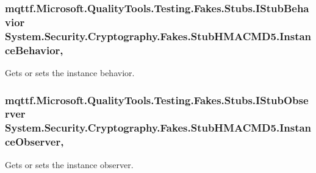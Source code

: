 \hypertarget{class_system_1_1_security_1_1_cryptography_1_1_fakes_1_1_stub_h_m_a_c_m_d5_ace9820fb7b4d98d2214ba3f9b1044179}{
\subsubsection[{Instance\-Behavior}]{\setlength{\rightskip}{0pt plus 5cm}mqttf.\-Microsoft.\-Quality\-Tools.\-Testing.\-Fakes.\-Stubs.\-I\-Stub\-Behavior System.\-Security.\-Cryptography.\-Fakes.\-Stub\-H\-M\-A\-C\-M\-D5.\-Instance\-Behavior\hspace{0.3cm}{\ttfamily [get]}, {\ttfamily [set]}}}\label{class_system_1_1_security_1_1_cryptography_1_1_fakes_1_1_stub_h_m_a_c_m_d5_ace9820fb7b4d98d2214ba3f9b1044179}


Gets or sets the instance behavior.

\hypertarget{class_system_1_1_security_1_1_cryptography_1_1_fakes_1_1_stub_h_m_a_c_m_d5_a0ea9cb642bdce37c50cb92a8cf85859e}{
\subsubsection[{Instance\-Observer}]{\setlength{\rightskip}{0pt plus 5cm}mqttf.\-Microsoft.\-Quality\-Tools.\-Testing.\-Fakes.\-Stubs.\-I\-Stub\-Observer System.\-Security.\-Cryptography.\-Fakes.\-Stub\-H\-M\-A\-C\-M\-D5.\-Instance\-Observer\hspace{0.3cm}{\ttfamily [get]}, {\ttfamily [set]}}}\label{class_system_1_1_security_1_1_cryptography_1_1_fakes_1_1_stub_h_m_a_c_m_d5_a0ea9cb642bdce37c50cb92a8cf85859e}


Gets or sets the instance observer.

